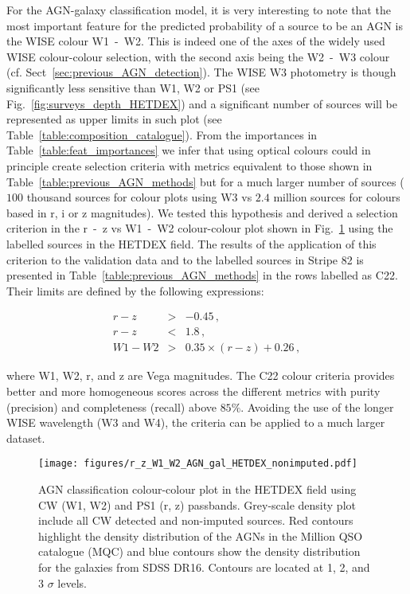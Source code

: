 \documentclass{aa}
\begin{document}
For the AGN-galaxy classification model, it is very interesting to note that the most important feature for the predicted probability of a source to be an AGN is the WISE colour W1~-~W2. This is indeed one of the axes of the widely used WISE colour-colour selection, with the second axis being the W2~-~W3 colour (cf. Sect~\ref{sec:previous_AGN_detection}). The WISE W3 photometry is though significantly less sensitive than W1, W2 or PS1 (see Fig.~\ref{fig:surveys_depth_HETDEX}) and a significant number of sources will be represented as upper limits in such plot (see Table~\ref{table:composition_catalogue}). From the importances in Table~\ref{table:feat_importances} we infer that using optical colours could in principle create selection criteria with metrics equivalent to those shown in Table~\ref{table:previous_AGN_methods} but for a much larger number of sources ($100$ thousand sources for colour plots using W3 vs $2.4$ million sources for colours based in r, i or z magnitudes). We tested this hypothesis and derived a selection criterion in the r~-~z vs W1~-~W2 colour-colour plot shown in Fig.~\ref{fig:HETDEX_rz_W1W2_AGN_gal_class} using the labelled sources in the HETDEX field. The results of the application of this criterion to the validation data and to the labelled sources in Stripe 82 is presented in Table~\ref{table:previous_AGN_methods} in the rows labelled as C22. Their limits are defined by the following expressions:

\begin{eqnarray}
r - z &>& -0.45\,,\\
r - z &<& 1.8\,,\\
W1 - W2 &>& 0.35 \times (r - z) + 0.26\,,
\end{eqnarray}

\noindent where W1, W2, r, and z are Vega magnitudes. The C22 colour criteria provides better and more homogeneous scores across the different metrics with purity (precision) and completeness (recall) above $85\%$. Avoiding the use of the longer WISE wavelength (W3 and W4), the criteria can be applied to a much larger dataset.


\begin{figure}
    \centering
    \begin{minipage}{0.99\columnwidth}
    \texttt{[image: figures/r\_z\_W1\_W2\_AGN\_gal\_HETDEX\_nonimputed.pdf]}
    \end{minipage}%
    \caption{AGN classification colour-colour plot in the HETDEX field using CW (W1, W2) and PS1 (r, z) passbands. Grey-scale density plot include all CW detected and non-imputed sources. Red contours highlight the density distribution of the AGNs in the Million QSO catalogue (MQC) and blue contours show the density distribution for the galaxies from SDSS DR16. Contours are located at 1, 2, and 3 $\sigma$ levels.}
   \label{fig:HETDEX_rz_W1W2_AGN_gal_class}
\end{figure}
\end{document}

